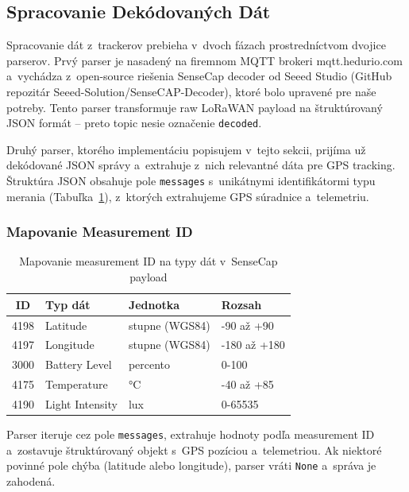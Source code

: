\subsection{Spracovanie Dekódovaných Dát}
\label{sec:Parser}

Spracovanie dát z~trackerov prebieha v~dvoch fázach prostredníctvom dvojice parserov. Prvý parser je nasadený na firemnom MQTT brokeri mqtt.hedurio.com a~vychádza z~open-source riešenia SenseCap decoder od Seeed Studio (GitHub repozitár Seeed-Solution/SenseCAP-Decoder), ktoré bolo upravené pre naše potreby. Tento parser transformuje raw LoRaWAN payload na štruktúrovaný JSON formát -- preto topic nesie označenie \texttt{decoded}.

Druhý parser, ktorého implementáciu popisujem v~tejto sekcii, prijíma už dekódované JSON správy a~extrahuje z~nich relevantné dáta pre GPS tracking. Štruktúra JSON obsahuje pole \texttt{messages} s~unikátnymi identifikátormi typu merania (Tabuľka~\ref{tab:measurement-ids}), z~ktorých extrahujeme GPS súradnice a~telemetriu.

\subsubsection{Mapovanie Measurement ID}

\begin{table}[htbp]
    \centering
    \begin{tabular}{|c|l|l|l|}
        \hline
        \textbf{ID} & \textbf{Typ dát} & \textbf{Jednotka} & \textbf{Rozsah} \\
        \hline
        4198 & Latitude & stupne (WGS84) & -90 až +90 \\
        4197 & Longitude & stupne (WGS84) & -180 až +180 \\
        3000 & Battery Level & percento & 0-100 \\
        4175 & Temperature & °C & -40 až +85 \\
        4190 & Light Intensity & lux & 0-65535 \\
        \hline
    \end{tabular}
    \caption{Mapovanie measurement ID na typy dát v~SenseCap payload}
    \label{tab:measurement-ids}
\end{table}

Parser iteruje cez pole \texttt{messages}, extrahuje hodnoty podľa measurement ID a~zostavuje štruktúrovaný objekt s~GPS pozíciou a~telemetriou. Ak niektoré povinné pole chýba (latitude alebo longitude), parser vráti \texttt{None} a~správa je zahodená.

